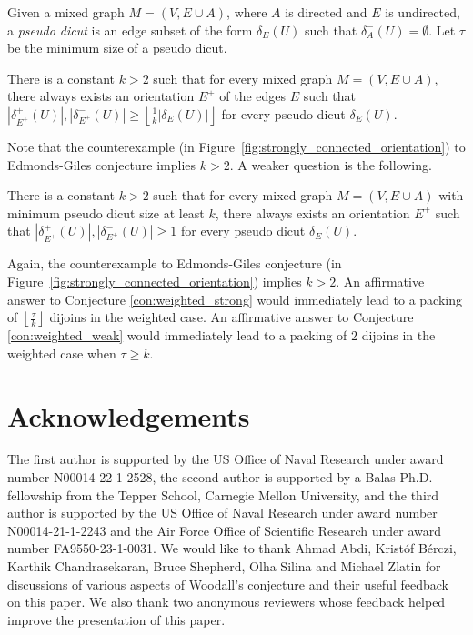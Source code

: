 \documentclass[runningheads]{llncs}
\newcommand{\rounddown}[1]{\left\lfloor#1\right\rfloor}
\begin{document}
Given a mixed graph $M=(V,E\cup A)$, where $A$ is directed and $E$ is undirected, a \textit{pseudo dicut} is an edge subset of the form $\delta_E(U)$ such that $\delta^-_A(U)=\emptyset$. Let $\tau$ be the minimum size of a pseudo dicut.
\begin{conjecture}\label{con:weighted_strong}
There is a constant $k>2$ such that for every mixed graph $M=(V,E\cup A)$, there always exists an orientation $E^+$ of the edges $E$ such that 
$|\delta_{E^+}^+(U)|,|\delta_{E^+}^-(U)|\geq \rounddown{\frac{1}{k}|\delta_E(U)|}$ for every pseudo dicut $\delta_E(U)$.
\end{conjecture}
Note that the counterexample (in Figure~\ref{fig:strongly_connected_orientation}) to Edmonds-Giles conjecture implies $k> 2$. A weaker question is the following.
\begin{conjecture}\label{con:weighted_weak}
    There is a constant $k>2$ such that for every mixed graph $M=(V,E\cup A)$ with minimum pseudo dicut size at least $k$, there always exists an orientation $E^+$ such that $|\delta_{E^+}^+(U)|,|\delta_{E^+}^-(U)|\geq 1$ for every pseudo dicut $\delta_E(U)$.
\end{conjecture}
Again, the counterexample to Edmonds-Giles conjecture (in Figure~\ref{fig:strongly_connected_orientation}) implies $k>2$. An affirmative answer to Conjecture \ref{con:weighted_strong} would immediately lead to a packing of $\rounddown{\frac{\tau}{k}}$ dijoins in the weighted case. An affirmative answer to Conjecture \ref{con:weighted_weak} would immediately lead to a packing of $2$ dijoins in the weighted case when $\tau\geq k$.


\section*{Acknowledgements}
The first author is supported by the US Office of Naval Research under award number N00014-22-1-2528, the second author is supported by a Balas Ph.D. fellowship from the Tepper School, Carnegie Mellon University, and the third author is supported by the US Office of Naval Research under award number N00014-21-1-2243 and the Air Force Office of Scientific Research under award number FA9550-23-1-0031. We would like to thank Ahmad Abdi, Krist\'of B\'erczi, Karthik Chandrasekaran, Bruce Shepherd, Olha Silina and Michael Zlatin for discussions of various aspects of Woodall's conjecture and their useful feedback on this paper. We also thank two anonymous reviewers whose feedback helped improve the presentation of this paper.

\newpage
 
\end{document}
